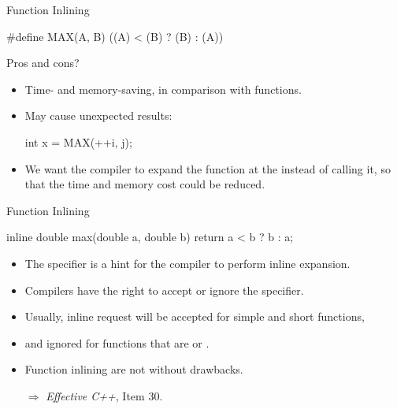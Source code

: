 \documentclass{beamer}
\begin{document}
\begin{frame}[fragile]{Function Inlining}
	\begin{cpp}
#define MAX(A, B) ((A) < (B) ? (B) : (A))
	\end{cpp}
	Pros and cons?
	\pause
	\begin{itemize}
		\item Time- and memory-saving, in comparison with functions.
		\item May cause unexpected results:
		\begin{cpp}
int x = MAX(++i, j);
		\end{cpp}
		\pause
		\item We want the compiler to expand the function at the  instead of calling it, so that the time and memory cost could be reduced.
	\end{itemize}
\end{frame}

\begin{frame}[fragile]{Function Inlining}
	\begin{cpp}
inline double max(double a, double b) {
  return a < b ? b : a;
}
	\end{cpp}
	\begin{itemize}
		\item The  specifier is a hint for the compiler to perform inline expansion.
		\item Compilers have the right to accept or ignore the  specifier.
		\pause
		\item Usually, inline request will be accepted for simple and short functions,
		\item and ignored for functions that are  or .
		\pause
		\item Function inlining are not without drawbacks.
		\item[\(\Rightarrow\)] \textit{Effective C++}, Item 30.
	\end{itemize}
\end{frame}
\end{document}
